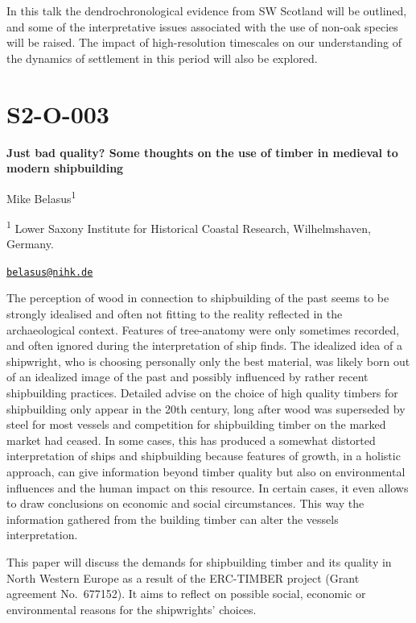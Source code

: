 \documentclass[
]{book}
\begin{document}
In this talk the dendrochronological evidence from SW Scotland will be outlined, and some of the interpretative issues associated with the use of non-oak species will be raised. The impact of high-resolution timescales on our understanding of the dynamics of settlement in this period will also be explored.

\hypertarget{s2-o-003}{%
\section*{S2-O-003}\label{s2-o-003}}

\textbf{Just bad quality? Some thoughts on the use of timber in medieval to modern shipbuilding}

Mike Belasus\textsuperscript{1}

\textsuperscript{1} Lower Saxony Institute for Historical Coastal Research, Wilhelmshaven, Germany.

\href{mailto:belasus@nihk.de}{\nolinkurl{belasus@nihk.de}}

The perception of wood in connection to shipbuilding of the past seems to be strongly idealised and often not fitting to the reality reflected in the archaeological context. Features of tree-anatomy were only sometimes recorded, and often ignored during the interpretation of ship finds. The idealized idea of a shipwright, who is choosing personally only the best material, was likely born out of an idealized image of the past and possibly influenced by rather recent shipbuilding practices. Detailed advise on the choice of high quality timbers for shipbuilding only appear in the 20th century, long after wood was superseded by steel for most vessels and competition for shipbuilding timber on the marked market had ceased. In some cases, this has produced a somewhat distorted interpretation of ships and shipbuilding because features of growth, in a holistic approach, can give information beyond timber quality but also on environmental influences and the human impact on this resource. In certain cases, it even allows to draw conclusions on economic and social circumstances. This way the information gathered from the building timber can alter the vessels interpretation.

This paper will discuss the demands for shipbuilding timber and its quality in North Western Europe as a result of the ERC-TIMBER project (Grant agreement No.~677152). It aims to reflect on possible social, economic or environmental reasons for the shipwrights' choices.
\end{document}
